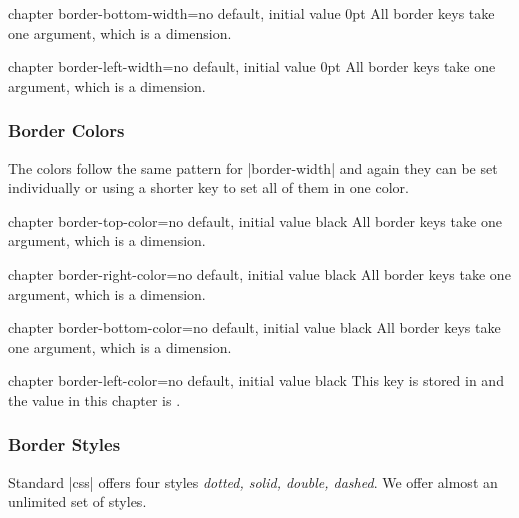 \begin{docKey}[]{chapter border-bottom-width}{=}{no default, initial value 0pt}
All border keys take one argument, which is a dimension.
\end{docKey}

\begin{docKey}[]{chapter border-left-width}{=}{no default, initial value 0pt}
All border keys take one argument, which is a dimension.
\end{docKey}

\subsubsection{Border Colors}

The colors follow the same pattern for |border-width| and again they can be set individually or using
a shorter key to set all of them in one color. 

\begin{docKey}[]{chapter border-top-color}{=}{no default, initial value black}
All border keys take one argument, which is a dimension.
\end{docKey}

\begin{docKey}[]{chapter border-right-color}{=}{no default, initial value black}
All border keys take one argument, which is a dimension.
\end{docKey}

\begin{docKey}[]{chapter border-bottom-color}{=}{no default, initial value black}
All border keys take one argument, which is a dimension.
\end{docKey}

\begin{docKey}[]{chapter border-left-color}{=}{no default, initial value black}
This key is stored in \cmd{\chapterborderrightcolor} and the value in this chapter is \texttt{\chapterborderrightcolor}.
\end{docKey}

\subsubsection{Border Styles}

Standard |css|  offers four styles \emph{dotted, solid, double, dashed}. We offer almost an unlimited set of styles.

